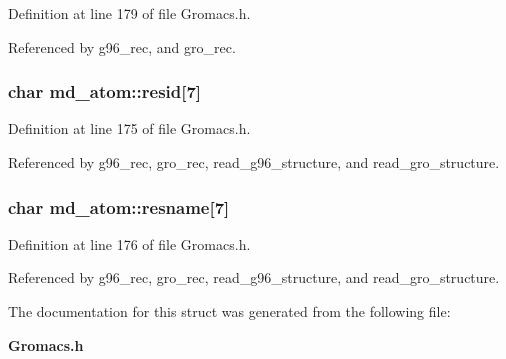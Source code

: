 Definition at line 179 of file Gromacs.h.

Referenced by g96\_\-rec, and gro\_\-rec.
\subsubsection{\setlength{\rightskip}{0pt plus 5cm}char md\_\-atom::resid[7]}\label{structmd__atom_m0}




Definition at line 175 of file Gromacs.h.

Referenced by g96\_\-rec, gro\_\-rec, read\_\-g96\_\-structure, and read\_\-gro\_\-structure.
\subsubsection{\setlength{\rightskip}{0pt plus 5cm}char md\_\-atom::resname[7]}\label{structmd__atom_m1}




Definition at line 176 of file Gromacs.h.

Referenced by g96\_\-rec, gro\_\-rec, read\_\-g96\_\-structure, and read\_\-gro\_\-structure.

The documentation for this struct was generated from the following file:\begin{CompactItemize}
\item 
{\bf Gromacs.h}\end{CompactItemize}
